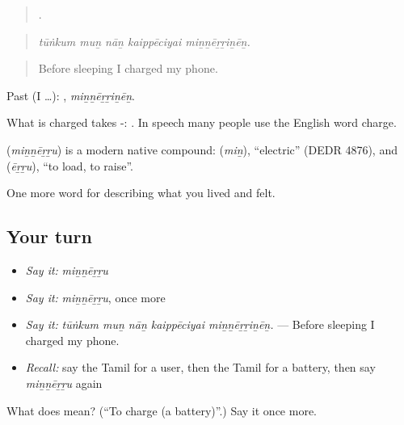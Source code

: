 \begin{quote}
    .
\end{quote}

\begin{quote}
\emph{tūṅkum muṉ nāṉ kaippēciyai miṉṉēṟṟiṉēṉ.}
\end{quote}

\begin{quote}
Before sleeping I charged my phone.
\end{quote}

Past (I …): , \emph{miṉṉēṟṟiṉēṉ}.

What is charged takes -:  . In speech many people use the English word charge.

\begin{cousinweb}
\textbf{} (\emph{miṉṉēṟṟu}) is a modern native compound:  (\emph{miṉ}), \textquotedblleft{}electric\textquotedblright{} (DEDR 4876), and  (\emph{ēṟṟu}), \textquotedblleft{}to load, to raise\textquotedblright{}.
\end{cousinweb}

\begin{grammarlens}[title={What you've built}]
One more word for describing what you lived and felt.
\end{grammarlens}

\subsection*{Your turn}
\begin{itemize}
\raggedright
  \item \emph{Say it:} \emph{miṉṉēṟṟu}
  \item \emph{Say it:} \emph{miṉṉēṟṟu}, once more
  \item \emph{Say it:} \emph{tūṅkum muṉ nāṉ kaippēciyai miṉṉēṟṟiṉēṉ.} — Before sleeping I charged my phone.
  \item \emph{Recall:} say the Tamil for a user, then the Tamil for a battery, then say \emph{miṉṉēṟṟu} again
\end{itemize}

\begin{tcolorbox}[breakable,colback=teal!4,colframe=teal!35!black,title={Before you move on}]
What does  mean? (\textquotedblleft{}To charge (a battery)\textquotedblright{}.) Say it once more.
\end{tcolorbox}
